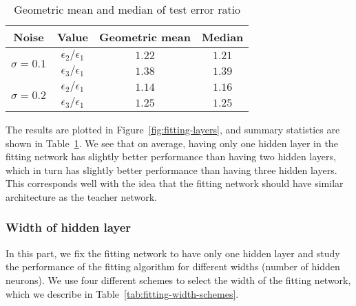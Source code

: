 \documentclass[twoside,11pt]{article}
\begin{document}
\begin{table}[htbp]
  \begin{center}
    \begin{tabular}{ c c c c }
      \hline
      Noise                         & Value                   & Geometric mean & Median
      \\ \hline
      \multirow{2}{*}{$\sigma=0.1$} & $\epsilon_2/\epsilon_1$ & $1.22$         & $1.21$
      \\
                                    & $\epsilon_3/\epsilon_1$ & $1.38$         & $1.39$
      \\ \hline
      \multirow{2}{*}{$\sigma=0.2$} & $\epsilon_2/\epsilon_1$ & $1.14$         & $1.16$
      \\
                                    & $\epsilon_3/\epsilon_1$ & $1.25$         & $1.25$
    \end{tabular}
  \end{center}
  \caption{Geometric mean and median of test error ratio}
  \label{tab:fitting-layers}
\end{table}

The results are plotted in Figure~\ref{fig:fitting-layers}, and summary statistics are shown in Table~\ref{tab:fitting-layers}.
We see that on average, having only one hidden layer in the fitting network has slightly better performance than having two hidden layers, which in turn has slightly better performance than having three hidden layers.
This corresponds well with the idea that the fitting network should have similar architecture as the teacher network.


\subsubsection{Width of hidden layer}
In this part, we fix the fitting network to have only one hidden layer and
study the performance of the fitting algorithm for different widths (number of hidden neurons).
We use four different schemes to select the width of the fitting network, which we describe in Table~\ref{tab:fitting-width-schemes}.
\end{document}

